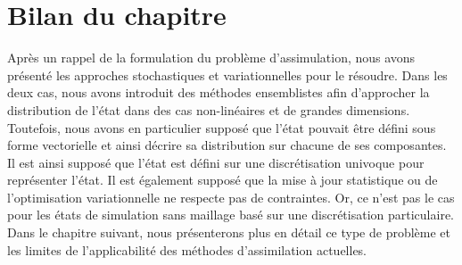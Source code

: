 \section{Bilan du chapitre}

Après un rappel de la formulation du problème d'assimulation, nous avons présenté les approches stochastiques et variationnelles pour le résoudre. Dans les deux cas, nous avons introduit des méthodes ensemblistes afin d'approcher la distribution de l'état dans des cas non-linéaires et de grandes dimensions. Toutefois, nous avons en particulier supposé que l'état pouvait être défini sous forme vectorielle et ainsi décrire sa distribution sur chacune de ses composantes. Il est ainsi supposé que l'état est défini sur une discrétisation univoque pour représenter l'état. Il est également supposé que la mise à jour statistique ou de l'optimisation variationnelle ne respecte pas de contraintes. Or, ce n'est pas le cas pour les états de simulation sans maillage basé sur une discrétisation particulaire. Dans le chapitre suivant, nous présenterons plus en détail ce type de problème et les limites de l'applicabilité des méthodes d'assimilation actuelles.

